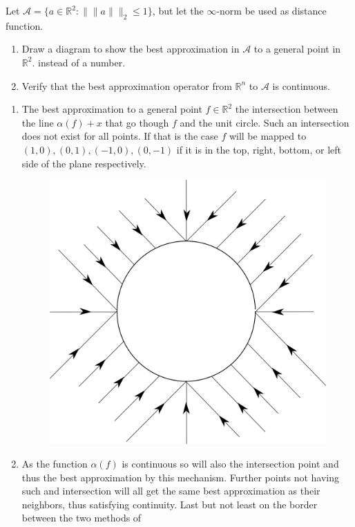 \begin{problem}
  Let $\mathcal{A} = \{a \in \mathds{R}^2 : \|\|a\|\|_2 \leq1 \}$,
  but let the $\infty$-norm be used as distance function.

\begin{enumerate}
\item Draw a diagram to show the best approximation in $\mathcal{A}$
  to a general point in $\mathds{R}^2$.  instead of a number.
\item Verify that the best approximation operator from $\mathds{R}^n$
  to $\mathcal{A}$ is continuous.
\end{enumerate}

\end{problem}

\begin{solution}
\begin{enumerate}
\item The best approximation to a general point $f \in \mathds{R}^2$
  the intersection between the line $\alpha(f) + x$ that go though $f$
  and the unit circle. Such an intersection does not exist for all
  points. If that is the case $f$ will be mapped to $(1, 0), (0, 1),
  (-1, 0), (0, -1)$ if it is in the top, right, bottom, or left side
  of the plane respectively.
  \begin{figure}[!ht]
  \centering \includegraphics[scale = 0.2]{drawing_task_4.png}
  \label{fig:task_4}
\end{figure}

\item As the function $\alpha(f)$ is continuous so will also the
  intersection point and thus the best approximation by this
  mechanism. Further points not having such and intersection will all
  get the same best approximation as their neighbors, thus satisfying
  continuity. Last but not least on the border between the two methods
  of
\end{enumerate}
\end{solution}

 	

